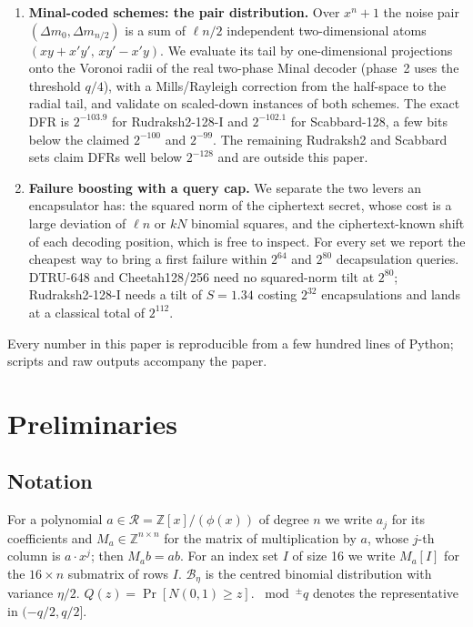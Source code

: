 \documentclass[11pt,a4paper]{article}
\theoremstyle{definition}
\theoremstyle{remark}
\newcommand{\Z}{\mathbb{Z}}
\newcommand{\R}{\mathcal{R}}
\newcommand{\CBD}{\mathcal{B}}
\newcommand{\Dm}{\Delta m}
\begin{document}
\begin{enumerate}
The DFR of Cheetah128/256/384/512 is $2^{-79.1}$, $2^{-51.8}$,
$2^{-116.1}$, $2^{-201.0}$. Evaluating the specification's own formula as
written gives $2^{-163}$, $2^{-126}$, $2^{-149}$, $2^{-336}$.
\item \textbf{Minal-coded schemes: the pair distribution.} Over $x^n+1$
the noise pair $(\Dm_0,\Dm_{n/2})$ is a sum of $\ell n/2$ independent
two-dimensional atoms $(xy+x'y',\,xy'-x'y)$. We evaluate its tail by
one-dimensional projections onto the Voronoi radii of the real two-phase
Minal decoder (phase~2 uses the threshold $q/4$), with a Mills/Rayleigh
correction from the half-space to the radial tail, and validate on
scaled-down instances of both schemes. The exact DFR is $2^{-103.9}$ for
Rudraksh2-128-I and $2^{-102.1}$ for Scabbard-128, a few bits below the
claimed $2^{-100}$ and $2^{-99}$. The remaining Rudraksh2 and Scabbard
sets claim DFRs well below $2^{-128}$ and are outside this paper.
\item \textbf{Failure boosting with a query cap.} We separate the two
levers an encapsulator has: the squared norm of the ciphertext secret,
whose cost is a large deviation of $\ell n$ or $kN$ binomial squares, and the
ciphertext-known shift of each decoding position, which is free to inspect.
For every set we report the cheapest way to bring a first failure within
$2^{64}$ and $2^{80}$ decapsulation queries. DTRU-648 and Cheetah128/256
need no squared-norm tilt at $2^{80}$; Rudraksh2-128-I needs a tilt of
$S=1.34$ costing $2^{32}$ encapsulations and lands at a classical total of
$2^{112}$.
\end{enumerate}

Every number in this paper is reproducible from a few hundred lines of
Python; scripts and raw outputs accompany the paper.

\section{Preliminaries}

\subsection{Notation}
For a polynomial $a\in\R=\Z[x]/(\phi(x))$ of degree $n$ we write $a_j$ for
its coefficients and $M_a\in\Z^{n\times n}$ for the matrix of
multiplication by $a$, whose $j$-th column is $a\cdot x^j$; then $M_a b=ab$.
For an index set $I$ of size 16 we write $M_a[I]$ for the $16\times n$
submatrix of rows $I$. $\CBD_\eta$ is the centred binomial distribution
with variance $\eta/2$. $Q(z)=\Pr[N(0,1)\ge z]$. $\bmod^{\pm}q$ denotes
the representative in $(-q/2,q/2]$.
\end{document}
